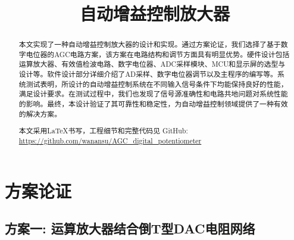 \documentclass[lang=cn,11pt,a4paper]{elegantpaper}
\title{自动增益控制放大器}
\date{\zhtoday}
\begin{document}
\maketitle

\begin{abstract}
  本文实现了一种自动增益控制放大器的设计和实现。通过方案论证，我们选择了基于数字电位器的AGC电路方案，该方案在电路结构和调节方面具有明显优势。硬件设计包括运算放大器、有效值检波电路、数字电位器、ADC采样模块、MCU和显示屏的选型与设计等。软件设计部分详细介绍了AD采样、数字电位器调节以及主程序的编写等。系统测试表明，所设计的自动增益控制系统在不同输入信号条件下均能保持良好的性能，满足设计要求。在测试过程中，我们也发现了信号源准确性和电路共地问题对系统性能的影响。最终，本设计验证了其可靠性和稳定性，为自动增益控制领域提供了一种有效的解决方案。

  本文采用\LaTeX{}书写，工程细节和完整代码见 GitHub: \url{https://github.com/wanansu/AGC_digital_potentiometer}
\end{abstract}

\newpage

\begin{center}\tableofcontents\end{center}
\section{方案论证}

\subsection{方案一: 运算放大器结合倒T型DAC电阻网络}
\end{document}
